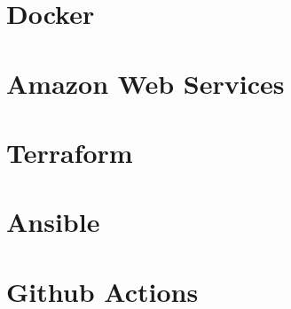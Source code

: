 \documentclass[a4paper]{article}
\begin{document}
    \newpage
    \section{Docker}
    \subsection{}
    \subsection{}
    
    \newpage
    \section{Amazon Web Services}
    \subsection{}
    \subsection{}
    
    \newpage
    \section{Terraform}
    \subsection{}
    \subsection{}
    
    \newpage
    \section{Ansible}
    \subsection{}
    \subsection{}

    \newpage
    \section{Github Actions}
    \subsection{}
    \subsection{}
\end{document}
